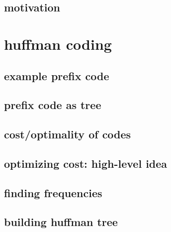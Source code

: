 \subsection{motivation}



\section{huffman coding}

\subsection{example prefix code}



\subsection{prefix code as tree}



\subsection{cost/optimality of codes}



\subsection{optimizing cost: high-level idea}




\subsection{finding frequencies}




\subsection{building huffman tree}

